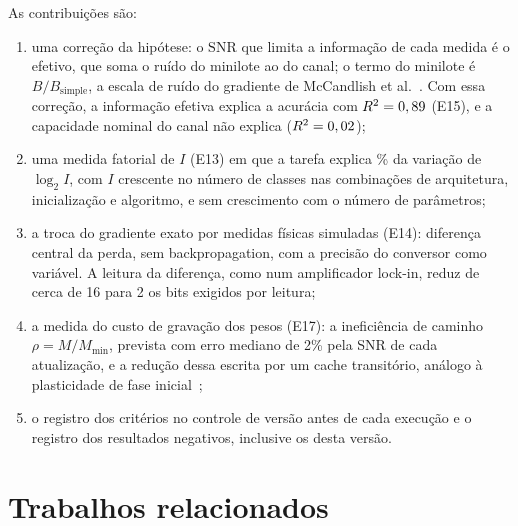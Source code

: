 \documentclass[journal]{IEEEtran}
\newcommand{\SNR}{\mathrm{SNR}}
\begin{document}
As contribuições são:
\begin{enumerate}
\item uma correção da hipótese: o $\SNR$ que limita a informação de cada medida é o efetivo, que soma o ruído do minilote ao do canal; o termo do minilote é $B/B_{\text{simple}}$, a escala de ruído do gradiente de McCandlish et al.~\cite{mccandlish2018}. Com essa correção, a informação efetiva explica a acurácia com $R^2 = 0,89$ (E15), e a capacidade nominal do canal não explica ($R^2 = 0,02$);
\item uma medida fatorial de $I$ (E13) em que a tarefa explica \EtrezeTarefa\% da variação de $\log_2 I$, com $I$ crescente no número de classes nas \EtrezeHdoze{} combinações de arquitetura, inicialização e algoritmo, e sem crescimento com o número de parâmetros;
\item a troca do gradiente exato por medidas físicas simuladas (E14): diferença central da perda, sem backpropagation, com a precisão do conversor como variável. A leitura da diferença, como num amplificador lock-in, reduz de cerca de 16 para 2 os bits exigidos por leitura;
\item a medida do custo de gravação dos pesos (E17): a ineficiência de caminho $\rho = M/M_{\min}$, prevista com erro mediano de 2\% pela SNR de cada atualização, e a redução dessa escrita por um cache transitório, análogo à plasticidade de fase inicial~\cite{li2020};
\item o registro dos critérios no controle de versão antes de cada execução e o registro dos resultados negativos, inclusive os desta versão.
\end{enumerate}

\section{Trabalhos relacionados}
\end{document}
